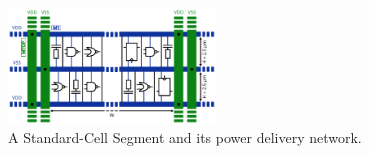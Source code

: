 \begin{figure}[h]
	\centering
	\includegraphics[width=0.49\textwidth]{./figures/psu_std_cell2.pdf}
	\caption{A Standard-Cell Segment and its power delivery network.}
	\label{fig_alim_std}
\end{figure}

